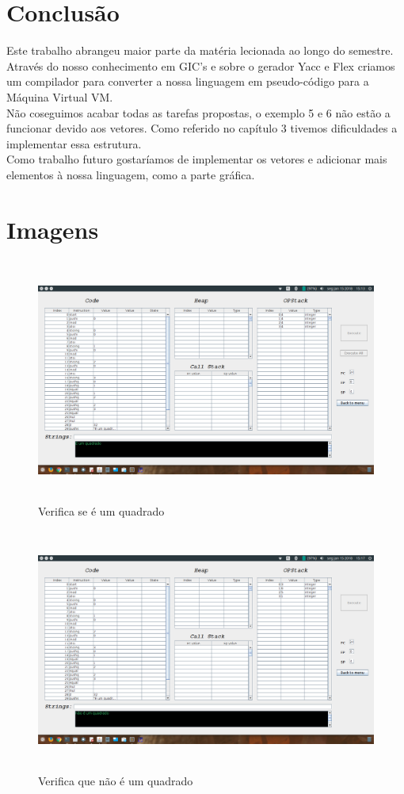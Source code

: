 \documentclass{report}
\begin{document}
\chapter{Conclusão} \label{concl}
 \indent
 Este trabalho abrangeu maior parte da matéria lecionada ao longo do semestre. Através do nosso conhecimento em GIC's e sobre o gerador Yacc e Flex criamos um compilador para converter a nossa linguagem em pseudo-código para a Máquina Virtual VM.\\
 Não coseguimos acabar todas as tarefas propostas, o exemplo 5 e 6 não estão a funcionar devido aos vetores. Como referido no capítulo 3 tivemos dificuldades a implementar essa estrutura.\\
 \indent
 Como trabalho futuro gostaríamos de implementar os vetores e adicionar mais elementos à nossa linguagem, como a parte gráfica. 

\appendix
\chapter{Imagens}

\begin{figure}[h]
	\centering
	\includegraphics[width=14cm,height= 8cm]{exemplo1-1.png}
	\caption{Verifica se é um quadrado}
	\label{Exemplo 1.1}
\end{figure}

\begin{figure}[h]
	\centering
	\includegraphics[width=14cm,height= 8cm]{exemplo1-2.png}
	\caption{Verifica que não é um quadrado}
	\label{Exemplo 1.2}
\end{figure}
\end{document}
